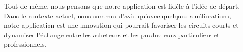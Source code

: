 \documentclass[11pt]{article}
\begin{document}
Tout de même, nous pensons que notre application est fidèle à l'idée de départ. Dans le contexte actuel, nous sommes d'avis qu'avec quelques améliorations, notre application est une innovation qui pourrait favoriser les circuits courts et dynamiser l’échange entre les acheteurs et les producteurs particuliers et professionnels.
\end{document}
